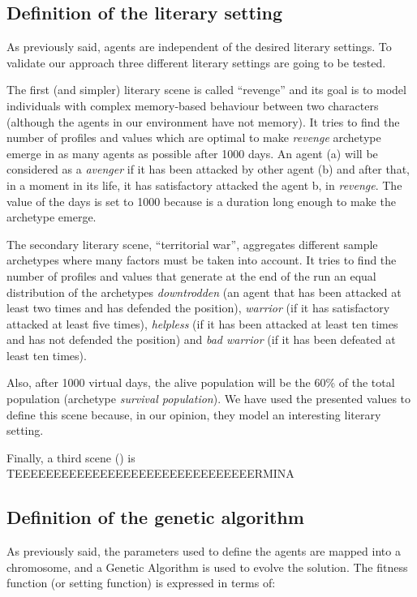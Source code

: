 \documentclass[letterpaper]{article}
\begin{document}
\subsection{Definition of the literary setting}

As previously said, agents are independent of the desired literary settings. To validate our approach three different literary settings are going to be tested.

The first (and simpler) literary scene is called ``revenge'' and its goal is to model individuals with complex memory-based behaviour between two characters (although the agents in our environment have not memory). It tries to find the number of profiles and values which are optimal to make \textit{revenge} archetype emerge in as many agents as possible after 1000 days.  An agent (a) will be considered as a \textit{avenger} if it has been attacked by other agent (b) and after that, in a moment in its life, it has satisfactory attacked the agent b, in \textit{revenge}. The value of the days is set to 1000 because is a duration long enough to make the archetype emerge. 

The secondary literary scene, ``territorial war'', aggregates different sample archetypes where many factors must be taken into account.  It tries to find the number of profiles and values that generate at the end of the run an equal distribution of the archetypes \textit{downtrodden} (an agent that has been attacked at least two times and has defended the position), \textit{warrior} (if it has satisfactory attacked at least five times), \textit{helpless} (if it has been attacked at least ten times and has not defended the position) and \textit{bad warrior} (if it has been defeated at least ten times).

 Also,  after 1000 virtual days, the alive population will be the 60\% of the total population (archetype \textit{survival population}). We have used the presented values to define this scene because, in our opinion, they model an interesting literary setting. 

Finally, a third scene () is TEEEEEEEEEEEEEEEEEEEEEEEEEEEEEEERMINA




\subsection{Definition of  the genetic algorithm}

As previously said, the parameters used to define the agents are mapped into a chromosome, and a Genetic Algorithm is used to evolve the solution. The fitness function (or setting function) is expressed in terms of:
\end{document}
